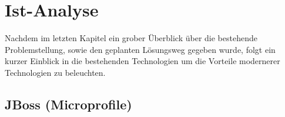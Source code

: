 \chapter{Ist-Analyse}

Nachdem im letzten Kapitel ein grober Überblick über die bestehende Problemstellung, sowie den geplanten Lösungsweg gegeben wurde, folgt ein kurzer Einblick in die bestehenden Technologien um die Vorteile modernerer Technologien zu beleuchten. 

\section{JBoss (Microprofile) \checkmark}


